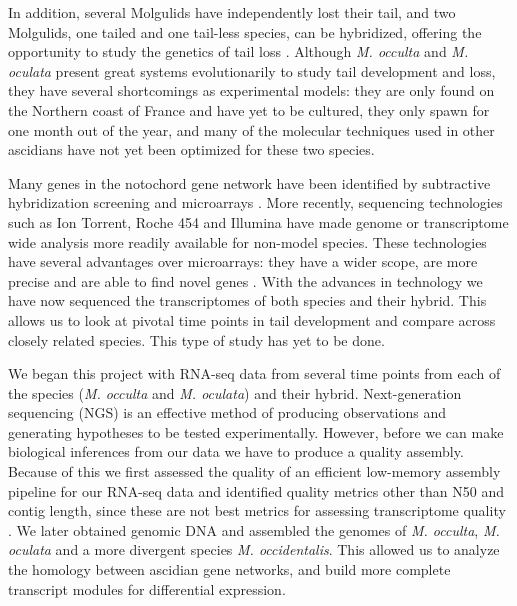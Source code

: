 In addition, several Molgulids have independently lost their tail, and two Molgulids, one tailed and one tail-less species, can be hybridized, offering the opportunity to study the genetics of tail loss \cite{jeffery_evolutionary_1991}. Although \textit{M. occulta} and \textit{M. oculata} present great systems evolutionarily to study tail development and loss, they have several shortcomings as experimental models: they are only found on the Northern coast of France and have yet to be cultured, they only spawn for one month out of the year, and many of the molecular techniques used in other ascidians have not yet been optimized for these two species.

Many genes in the notochord gene network have been identified by subtractive hybridization screening and microarrays \cite{jeffery_factors_1992,hotta_characterization_2000,gyoja_analysis_2007,kobayashi_differential_2013}. More recently, sequencing technologies such as Ion Torrent, Roche 454 and Illumina have made genome or transcriptome wide analysis more readily available for non-model species. These technologies have several advantages over microarrays: they have a wider scope, are more precise and are able to find novel genes \cite{marioni_rna-seq:_2008}. With the advances in technology we have now sequenced the transcriptomes of both species and their hybrid. This allows us to look at pivotal time points in tail development and compare across closely related species. This type of study has yet to be done. 

We began this project with RNA-seq data from several time points from each of the species (\textit{M. occulta} and \textit{M. oculata}) and their hybrid. Next-generation sequencing (NGS) is an effective method of producing observations and generating hypotheses to be tested experimentally. However, before we can make biological inferences from our data we have to produce a quality assembly. Because of this we first assessed the quality of an efficient low-memory assembly pipeline for our RNA-seq data and identified quality metrics other than N50 and contig length, since these are not best metrics for assessing transcriptome quality \cite{oneil_assessing_2013}. We later obtained genomic DNA and assembled the genomes of \textit{M. occulta}, \textit{M. oculata} and a more divergent species \textit{M. occidentalis}. This allowed us to analyze the homology between ascidian gene networks, and build more complete transcript modules for differential expression\cite{vijay_challenges_2012}.

